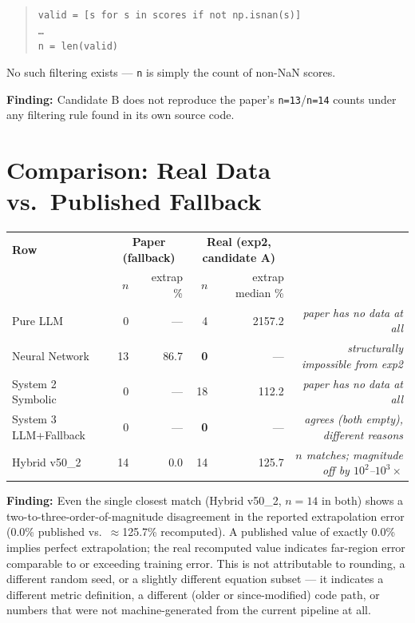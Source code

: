 \documentclass[11pt]{article}
\newcommand{\finding}[1]{\par\noindent\textbf{\textcolor{red!60!black}{Finding: }}#1\par}
\newcommand{\code}[1]{\texttt{#1}}
\begin{document}
\begin{quote}\small
\texttt{valid = [s for s in scores if not np.isnan(s)] \\
\ldots \\
n = len(valid)}
\end{quote}

No such filtering exists --- \code{n} is simply the count of non-NaN scores.
\finding{Candidate B does not reproduce the paper's \code{n=13}/\code{n=14}
counts under any filtering rule found in its own source code.}

\section{Comparison: Real Data vs.\ Published Fallback}

\begin{center}
\begin{tabular}{lrrrrr}
\toprule
\textbf{Row} & \multicolumn{2}{c}{\textbf{Paper (fallback)}} & \multicolumn{2}{c}{\textbf{Real (exp2, candidate A)}} & \\
             & $n$ & extrap \% & $n$ & extrap median \% & \\
\midrule
Pure LLM               & 0  & --- & 4  & 2157.2 & \textit{paper has no data at all} \\
Neural Network         & 13 & 86.7 & \textbf{0}  & --- & \textit{structurally impossible from exp2} \\
System 2 Symbolic      & 0  & --- & 18 & 112.2 & \textit{paper has no data at all} \\
System 3 LLM+Fallback  & 0  & --- & \textbf{0}  & --- & \textit{agrees (both empty), different reasons} \\
Hybrid v50\_2          & 14 & 0.0 & 14 & 125.7 & \textit{$n$ matches; magnitude off by $10^2$--$10^3\times$} \\
\bottomrule
\end{tabular}
\end{center}

\finding{Even the single closest match (Hybrid v50\_2, $n=14$ in both) shows
a two-to-three-order-of-magnitude disagreement in the reported
extrapolation error (0.0\% published vs.\ $\approx$125.7\% recomputed).
A published value of exactly 0.0\% implies perfect extrapolation; the real
recomputed value indicates far-region error comparable to or exceeding
training error. This is not attributable to rounding, a different random
seed, or a slightly different equation subset --- it indicates a different
metric definition, a different (older or since-modified) code path, or
numbers that were not machine-generated from the current pipeline at all.}
\end{document}
